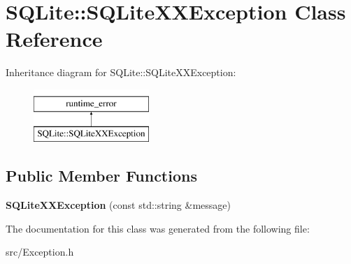 \hypertarget{class_s_q_lite_1_1_s_q_lite_x_x_exception}{\section{S\-Q\-Lite\-:\-:S\-Q\-Lite\-X\-X\-Exception Class Reference}
\label{class_s_q_lite_1_1_s_q_lite_x_x_exception}
}
Inheritance diagram for S\-Q\-Lite\-:\-:S\-Q\-Lite\-X\-X\-Exception\-:\begin{figure}[H]
\begin{center}
\leavevmode
\includegraphics[height=2.000000cm]{class_s_q_lite_1_1_s_q_lite_x_x_exception}
\end{center}
\end{figure}
\subsection*{Public Member Functions}
\begin{DoxyCompactItemize}
\item 
\hypertarget{class_s_q_lite_1_1_s_q_lite_x_x_exception_ae0075cd411707f313b1832235f6d10dd}{{\bfseries S\-Q\-Lite\-X\-X\-Exception} (const std\-::string \&message)}\label{class_s_q_lite_1_1_s_q_lite_x_x_exception_ae0075cd411707f313b1832235f6d10dd}

\end{DoxyCompactItemize}


The documentation for this class was generated from the following file\-:\begin{DoxyCompactItemize}
\item 
src/Exception.\-h\end{DoxyCompactItemize}
